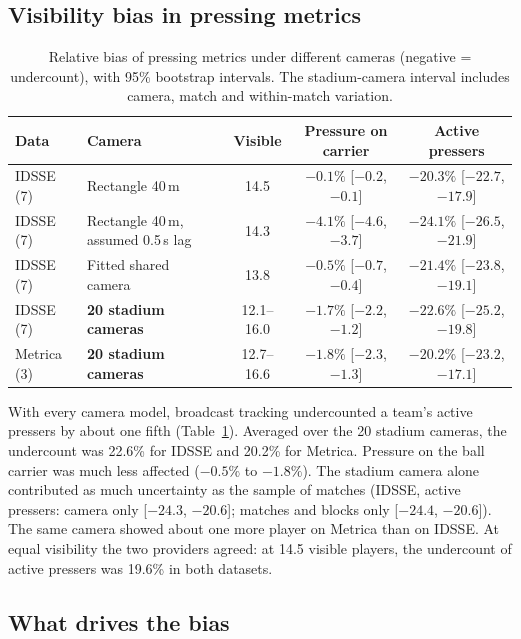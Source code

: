 \documentclass[]{interact}
\begin{document}
\subsection{Visibility bias in pressing metrics}

\begin{table}[t]
\centering
\caption{Relative bias of pressing metrics under different cameras (negative = undercount), with 95\% bootstrap
intervals. The stadium-camera interval includes camera, match and within-match variation.}
\label{tab:bias}
\small
\begin{tabular}{llccc}
\toprule
Data & Camera & Visible & Pressure on carrier & Active pressers \\
\midrule
IDSSE (7) & Rectangle 40\,m & 14.5 & $-0.1\%$ [$-0.2$, $-0.1$] & $-20.3\%$ [$-22.7$, $-17.9$] \\
IDSSE (7) & Rectangle 40\,m, assumed 0.5\,s lag & 14.3 & $-4.1\%$ [$-4.6$, $-3.7$] & $-24.1\%$ [$-26.5$, $-21.9$] \\
IDSSE (7) & Fitted shared camera & 13.8 & $-0.5\%$ [$-0.7$, $-0.4$] & $-21.4\%$ [$-23.8$, $-19.1$] \\
IDSSE (7) & \textbf{20 stadium cameras} & 12.1--16.0 & $\mathbf{-1.7\%}$ [$-2.2$, $-1.2$] & $\mathbf{-22.6\%}$ [$-25.2$, $-19.8$] \\
Metrica (3) & \textbf{20 stadium cameras} & 12.7--16.6 & $\mathbf{-1.8\%}$ [$-2.3$, $-1.3$] & $\mathbf{-20.2\%}$ [$-23.2$, $-17.1$] \\
\bottomrule
\end{tabular}
\end{table}

With every camera model, broadcast tracking undercounted a team's active pressers by about one fifth
(Table~\ref{tab:bias}). Averaged over the 20 stadium cameras, the undercount was 22.6\% for IDSSE and 20.2\% for
Metrica. Pressure on the ball carrier was much less affected ($-0.5\%$ to $-1.8\%$). The stadium camera alone
contributed as much uncertainty as the sample of matches (IDSSE, active pressers: camera only [$-24.3$, $-20.6$];
matches and blocks only [$-24.4$, $-20.6$]). The same camera showed about one more player on Metrica than on IDSSE.
At equal visibility the two providers agreed: at 14.5 visible players, the undercount of active pressers was 19.6\% in
both datasets.

\subsection{What drives the bias}
\label{sec:drivers}
\end{document}

